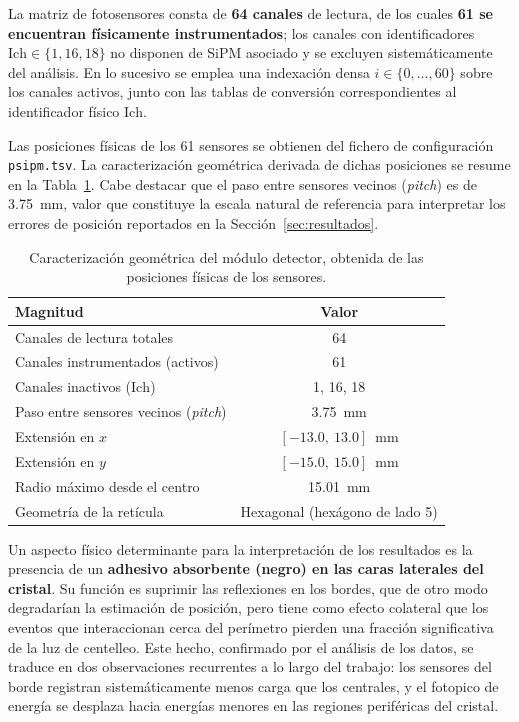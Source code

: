 La matriz de fotosensores consta de \textbf{64 canales} de lectura, de los cuales \textbf{61 se
encuentran físicamente instrumentados}; los canales con identificadores $\mathrm{Ich} \in
\{1, 16, 18\}$ no disponen de SiPM asociado y se excluyen sistemáticamente del análisis. En lo
sucesivo se emplea una indexación densa $i \in \{0, \dots, 60\}$ sobre los canales activos, junto
con las tablas de conversión correspondientes al identificador físico $\mathrm{Ich}$.

Las posiciones físicas de los 61 sensores se obtienen del fichero de configuración
\texttt{psipm.tsv}. La caracterización geométrica derivada de dichas posiciones se resume en la
Tabla~\ref{tab:geometria-detector}. Cabe destacar que el paso entre sensores vecinos
(\emph{pitch}) es de \SI{3.75}{\milli\metre}, valor que constituye la escala natural de referencia
para interpretar los errores de posición reportados en la Sección~\ref{sec:resultados}.

\begin{table}[htbp]
\centering
\caption{Caracterización geométrica del módulo detector, obtenida de las posiciones físicas
de los sensores.}
\label{tab:geometria-detector}
\begin{tabular}{lc}
\toprule
\textbf{Magnitud} & \textbf{Valor} \\
\midrule
Canales de lectura totales & 64 \\
Canales instrumentados (activos) & 61 \\
Canales inactivos ($\mathrm{Ich}$) & 1, 16, 18 \\
Paso entre sensores vecinos (\emph{pitch}) & \SI{3.75}{\milli\metre} \\
Extensión en $x$ & $[-13.0,\ 13.0]$~mm \\
Extensión en $y$ & $[-15.0,\ 15.0]$~mm \\
Radio máximo desde el centro & \SI{15.01}{\milli\metre} \\
Geometría de la retícula & Hexagonal (hexágono de lado 5) \\
\bottomrule
\end{tabular}
\end{table}

Un aspecto físico determinante para la interpretación de los resultados es la presencia de un
\textbf{adhesivo absorbente (negro) en las caras laterales del cristal}. Su función es suprimir las
reflexiones en los bordes, que de otro modo degradarían la estimación de posición, pero tiene como
efecto colateral que los eventos que interaccionan cerca del perímetro pierden una fracción
significativa de la luz de centelleo. Este hecho, confirmado por el análisis de los datos, se
traduce en dos observaciones recurrentes a lo largo del trabajo: los sensores del borde registran
sistemáticamente menos carga que los centrales, y el fotopico de energía se desplaza hacia energías
menores en las regiones periféricas del cristal.

